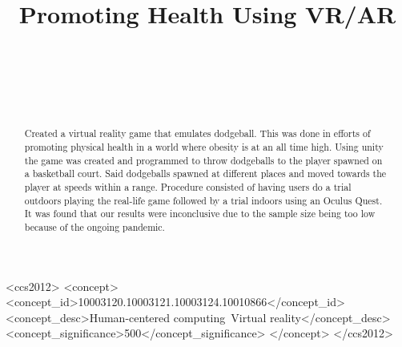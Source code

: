 \documentclass{sigchi}
\def\plaintitle{Promoting Health Using VR/AR}
\begin{document}
\title{\plaintitle}

\author{
  \\
  \\
  \\
  \\
}

\maketitle
\begin{abstract}
    Created a virtual reality game that emulates dodgeball. This was done in efforts of promoting physical health in a world where obesity is at an all time high. Using unity the game was created and programmed to throw dodgeballs to the player spawned on a basketball court. Said dodgeballs spawned at different places and moved towards the player at speeds within a range. Procedure consisted of having users do a trial outdoors playing the real-life game followed by a trial indoors using an Oculus Quest. It was found that our results were inconclusive due to the sample size being too low because of the ongoing pandemic.
\end{abstract}

\begin{CCSXML}
<ccs2012>
<concept>
<concept_id>10003120.10003121.10003124.10010866</concept_id>
<concept_desc>Human-centered computing~Virtual reality</concept_desc>
<concept_significance>500</concept_significance>
</concept>
</ccs2012>
\end{CCSXML}
\end{document}
